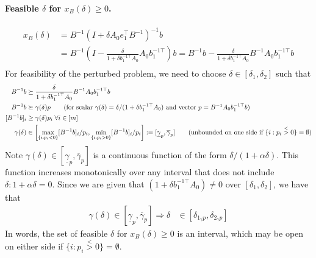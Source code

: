 \documentclass[11pt]{exam}
\begin{document}
\begin{questions}
    
    \paragraph{Feasible $\delta$ for $x_B(\delta)\geq 0$.}
    \begin{align*}
      x_B(\delta) &= B^{-1}(I + \delta A_0 e_1^\top B^{-1})^{-1}b\\
      &= B^{-1}\left(I - \frac{\delta}{1 + \delta b^{-1\top}_1 A_0}A_0b^{-1\top}_1\right)b = B^{-1}b - \frac{\delta}{1 + \delta b^{-1\top}_1 A_0}B^{-1}A_0b^{-1\top}_1b\\
    \end{align*}
    For feasibility of the perturbed problem, we need to choose $\delta \in [\delta_1, \delta_2]$ such that
    \begin{align*}
      B^{-1}b &\succeq \frac{\delta}{1 + \delta b^{-1\top}_1 A_0}B^{-1}A_0b^{-1\top}_1b\\
      B^{-1}b &\succeq \gamma(\delta) p \tag{for scalar $\gamma(\delta) = \delta / (1 + \delta b^{-1\top}_1 A_0)$ and vector $p = B^{-1}A_0b^{-1\top}_1b$}\\
      [B^{-1}b]_i &\geq \gamma(\delta)p_i\;\forall i\in[m]\\
      \gamma(\delta) &\in \left[\max_{\{i: p_i < 0\}}[B^{-1}b]_i/p_i,\min_{\{i: p_i > 0\}}[B^{-1}b]_i/p_i \right] := [\underline \gamma_p, \overline \gamma_p] \tag{unbounded on one side if $\{i: p_i \overset{<}{>} 0\} = \emptyset$}\\
    \end{align*}
    Note $\gamma(\delta) \in [\underline \gamma_p, \overline \gamma_p]$ is a continuous function of the form $\delta / (1 + \alpha\delta)$. This function increases monotonically over any interval that does not include $\delta: 1 + \alpha\delta = 0$. Since we are given that $(1 + \delta b^{-1\top}_1 A_0 ) \neq 0$ over $[\delta_1, \delta_2]$, we have that
    \begin{align*}
      \gamma(\delta) \in [\underline \gamma_p, \overline \gamma_p] \Longrightarrow \delta &\in [\delta_{1_\gamma p}, \delta_{2_\gamma p}]
    \end{align*}
    In words, the set of feasible $\delta$ for $x_B(\delta)\geq 0$ is an interval, which may be open on either side if $\{i: p_i \overset{<}{>} 0\} = \emptyset$.


\end{questions}
\end{document}
